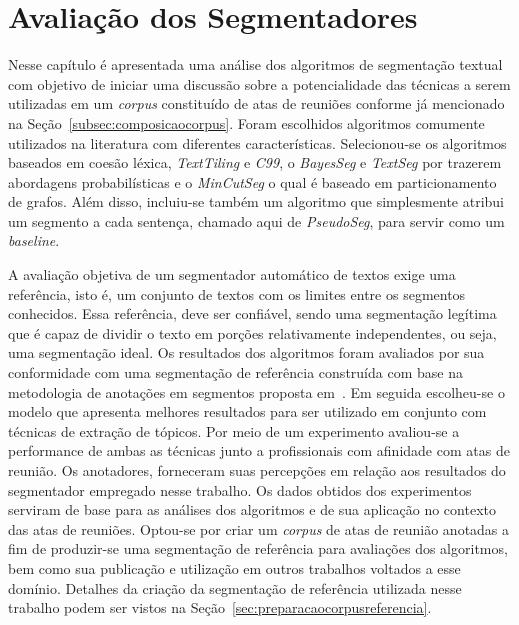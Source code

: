 \chapter{Avaliação dos Segmentadores}\label{cap-segmentadores}




Nesse capítulo é apresentada uma análise dos algoritmos de segmentação textual com objetivo de iniciar uma discussão sobre a potencialidade das técnicas a serem utilizadas em um \textit{corpus} constituído de atas de reuniões conforme já mencionado na Seção~\ref{subsec:composicaocorpus}. 
Foram escolhidos algoritmos comumente utilizados na literatura com diferentes características.  Selecionou-se os algoritmos baseados em coesão léxica, \textit{TextTiling} e \textit{C99}, o \textit{BayesSeg} e \textit{TextSeg} por trazerem abordagens probabilísticas e o \textit{MinCutSeg} o qual é baseado em particionamento de grafos.
% 
Além disso, incluiu-se também um algoritmo que simplesmente atribui um segmento a cada sentença, chamado aqui de \textit{PseudoSeg}, para servir como um \textit{baseline}.

A avaliação objetiva de um segmentador automático de textos exige uma referência, isto é, um conjunto de textos com os limites entre os segmentos conhecidos. Essa referência, deve ser confiável, sendo uma segmentação legítima que é capaz de dividir o texto em porções relativamente independentes, ou seja, uma segmentação ideal. 
%
Os resultados dos algoritmos foram avaliados por sua conformidade com uma segmentação de referência construída com base na metodologia de anotações em segmentos proposta em~\cite{Hovy2010}. 
Em seguida escolheu-se o modelo que apresenta melhores resultados para ser utilizado em conjunto com técnicas de extração de tópicos. Por meio de um experimento avaliou-se a performance de ambas as técnicas junto a profissionais com afinidade com atas de reunião. Os anotadores, forneceram suas percepções em relação aos resultados do segmentador empregado nesse trabalho.  
Os dados obtidos dos experimentos serviram de base para as análises dos algoritmos e de sua aplicação no contexto das atas de reuniões. 
Optou-se por criar um \textit{corpus} de atas de reunião anotadas a fim de produzir-se uma segmentação de referência para avaliações dos algoritmos, bem como sua publicação e utilização em outros trabalhos voltados a esse domínio. 
Detalhes da criação da segmentação de referência utilizada nesse trabalho podem ser vistos na Seção~\ref{sec:preparacaocorpusreferencia}.

